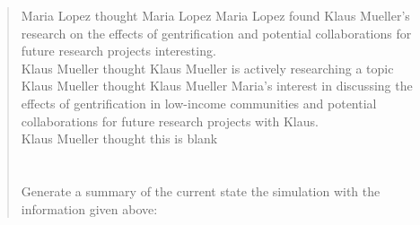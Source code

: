 \begin{quote}
{	Maria Lopez thought Maria Lopez Maria Lopez found Klaus Mueller's research on the effects of gentrification and potential collaborations for future research projects interesting. \\
	Klaus Mueller thought Klaus Mueller is actively researching a topic \\
	Klaus Mueller thought Klaus Mueller Maria's interest in discussing the effects of gentrification in low-income communities and potential collaborations for future research projects with Klaus. \\
	Klaus Mueller thought this is blank \\
	 \\
	 \\
	Generate a summary of the current state the simulation with the information given above: \\
    }
\end{quote}

\newpage

